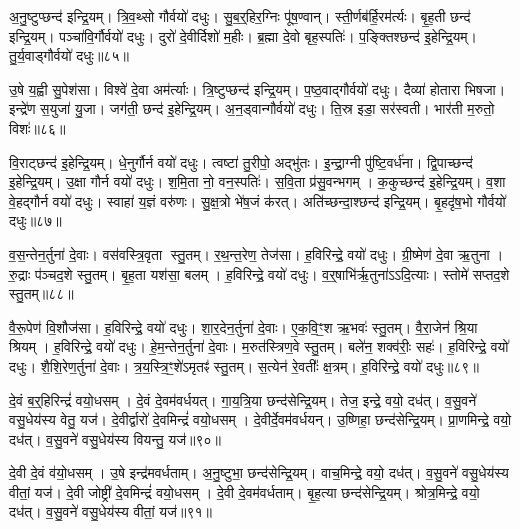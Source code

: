 अ॒नु॒ष्टुप्छन्द॑ इन्द्रि॒यम्।
त्रि॒व॒थ्सो गौर्वयो॑ दधुः।
सु॒ब॒र्॒हिर॒ग्निः पू॑ष॒ण्वान्।
स्ती॒र्णब॑र्हि॒रम॑र्त्यः।
बृ॒ह॒ती छन्द॑ इन्द्रि॒यम्।
पञ्चा॑वि॒र्गौर्वयो॑ दधुः।
दुरो॑ दे॒वीर्दिशो॑ म॒हीः।
ब्र॒ह्मा दे॒वो बृह॒स्पतिः॑।
प॒ङ्क्तिश्छन्द॑ इ॒हेन्द्रि॒यम्।
तु॒र्य॒वाड्गौर्वयो॑ दधुः॥८५॥

उ॒षे य॒ह्वी सु॒पेश॑सा।
विश्वे॑ दे॒वा अम॑र्त्याः।
त्रि॒ष्टुप्छन्द॑ इन्द्रि॒यम्।
प॒ष्ठ॒वाद्गौर्वयो॑ दधुः।
दैव्या॑ होतारा भिषजा।
इन्द्रे॑ण स॒युजा॑ यु॒जा।
जग॑ती॒ छन्द॑ इ॒हेन्द्रि॒यम्।
अ॒न॒ड्वान्गौर्वयो॑ दधुः।
ति॒स्र इडा॒ सर॑स्वती।
भार॑ती म॒रुतो॒ विशः॑॥८६॥

वि॒राट्छन्द॑ इ॒हेन्द्रि॒यम्।
धे॒नुर्गौर्न वयो॑ दधुः।
त्वष्टा॑ तु॒रीपो॒ अद्भु॑तः।
इ॒न्द्रा॒ग्नी पु॑ष्टि॒वर्ध॑ना।
द्वि॒पाच्छन्द॑ इ॒हेन्द्रि॒यम्।
उ॒क्षा गौर्न वयो॑ दधुः।
श॒मि॒ता नो॒ वन॒स्पतिः॑।
स॒वि॒ता प्र॑सु॒वन्भगम्।
क॒कुच्छन्द॑ इ॒हेन्द्रि॒यम्।
व॒शा वे॒हद्गौर्न वयो॑ दधुः।
स्वाहा॑ य॒ज्ञं वरु॑णः।
सु॒क्ष॒त्रो भे॑ष॒जं क॑रत्।
अति॑च्छन्दा॒श्छन्द॑ इन्द्रि॒यम्।
बृ॒हदृ॑ष॒भो गौर्वयो॑ दधुः॥८७॥\anuvakamend[अम॑र्त्यस्तुर्य॒वाड्गौर्वयो॑ दधु॒र्विशो॑ व॒शा वे॒हद्गौर्न वयो॑ दधुश्च॒त्वारि॑ च]

व॒स॒न्तेन॒र्तुना॑ दे॒वाः।
वस॑वस्त्रि॒वृता स्तु॒तम्।
र॒थ॒न्त॒रेण॒ तेज॑सा।
ह॒विरिन्द्रे॒ वयो॑ दधुः।
ग्री॒ष्मेण॑ दे॒वा ऋ॒तुना।
रु॒द्राः प॑ञ्चद॒शे स्तु॒तम्।
बृ॒ह॒ता यश॑सा॒ बलम्।
ह॒विरिन्द्रे॒ वयो॑ दधुः।
व॒र्॒षाभि॑र्\mbox{}ऋ॒तुना॑\-ऽऽदि॒त्याः।
स्तोमे॑ सप्तद॒शे स्तु॒तम्॥८८॥

वै॒रू॒पेण॑ वि॒शौज॑सा।
ह॒विरिन्द्रे॒ वयो॑ दधुः।
शा॒र॒देन॒र्तुना॑ दे॒वाः।
ए॒क॒वि॒ꣳ॒श ऋ॒भवः॑ स्तु॒तम्।
वै॒रा॒जेन॑ श्रि॒या श्रियम्।
ह॒विरिन्द्रे॒ वयो॑ दधुः।
हे॒म॒न्तेन॒र्तुना॑ दे॒वाः।
म॒रुत॑स्त्रिण॒वे स्तु॒तम्।
बले॑न॒ शक्व॑रीः॒ सहः॑।
ह॒विरिन्द्रे॒ वयो॑ दधुः।
शै॒शि॒रेण॒र्तुना॑ दे॒वाः।
त्र॒य॒स्त्रि॒ꣳ॒शे॑\-ऽमृतꣴ॑ स्तु॒तम्।
स॒त्येन॑ रे॒वतीः᳚ क्ष॒त्रम्।
ह॒विरिन्द्रे॒ वयो॑ दधुः॥८९॥\anuvakamend[स्तोमे॑ सप्तद॒शे स्तु॒तꣳ सहो॑ ह॒विरिन्द्रे॒ वयो॑ दधुश्च॒त्वारि॑ च (व॒स॒न्तेन॑ ग्री॒ष्मेण॑ व॒र्‌\mbox{}षाभिः॑ शार॒देन॑ हेम॒न्तेन॑ शैशि॒रेण॒ षट्॥)]

दे॒वं ब॒र्॒हिरिन्द्रं॑ वयो॒धसम्।
दे॒वं दे॒वम॑वर्धयत्।
गा॒य॒त्रि॒या छन्द॑सेन्द्रि॒यम्।
तेज॒ इन्द्रे॒ वयो॒ दध॑त्।
व॒सु॒वने॑ वसु॒धेय॑स्य वेतु॒ यज॑।
दे॒वीर्द्वारो॑ दे॒वमिन्द्रं॑ वयो॒धसम्।
दे॒वीर्दे॒वम॑वर्धयन्।
उ॒ष्णिहा॒ छन्द॑सेन्द्रि॒यम्।
प्रा॒णमिन्द्रे॒ वयो॒ दध॑त्।
व॒सु॒वने॑ वसु॒धेय॑स्य वियन्तु॒ यज॑॥९०॥

दे॒वी दे॒वं व॑यो॒धसम्।
उ॒षे इन्द्र॑मवर्धताम्।
अ॒नु॒ष्टुभा॒ छन्द॑सेन्द्रि॒यम्।
वाच॒मिन्द्रे॒ वयो॒ दध॑त्।
व॒सु॒वने॑ वसु॒धेय॑स्य वीतां॒ यज॑।
दे॒वी जोष्ट्री॑ दे॒वमिन्द्रं॑ वयो॒धसम्।
दे॒वी दे॒वम॑वर्धताम्।
बृ॒ह॒त्या छन्द॑सेन्द्रि॒यम्।
श्रोत्र॒मिन्द्रे॒ वयो॒ दध॑त्।
व॒सु॒वने॑ वसु॒धेय॑स्य वीतां॒ यज॑॥९१॥

